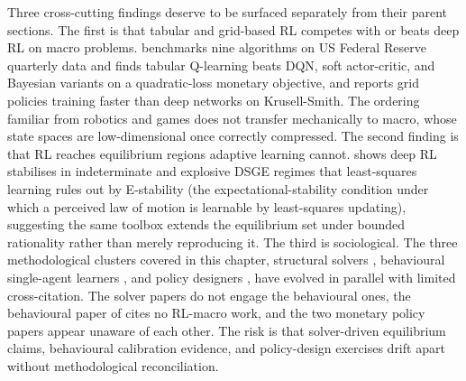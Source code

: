 Three cross-cutting findings deserve to be surfaced separately from
their parent sections. The first is that tabular and grid-based RL
competes with or beats deep RL on macro problems.
\citet{Wang2025mpu} benchmarks nine algorithms on US Federal
Reserve quarterly data and finds tabular Q-learning beats DQN, soft
actor-critic, and Bayesian variants on a quadratic-loss monetary
objective, and \citet{Yang2025srl} reports grid policies training
faster than deep networks on Krusell-Smith. The ordering familiar
from robotics and games does not transfer mechanically to macro,
whose state spaces are low-dimensional once correctly compressed.
The second finding is that RL reaches equilibrium regions adaptive
learning cannot. \citet{Chen2021drl} shows deep RL stabilises in
indeterminate and explosive DSGE regimes that least-squares
learning rules out by E-stability (the expectational-stability
condition under which a perceived law of motion is learnable by
least-squares updating), suggesting the same toolbox
extends the equilibrium set under bounded rationality rather than
merely reproducing it. The third is sociological. The three
methodological clusters covered in this chapter, structural solvers
\citep{Yang2025srl,Wibault2026rspg,Han2022deepham,Azinovic2026sequence},
behavioural single-agent learners
\citep{Kaplowitz2025,Kuriksha2021,Shi2022consumption}, and policy
designers
\citep{Zheng2022aie,Mi2024taxai,Chen2021drl,HinterlangTaenzer2024,Khundadze2025,Wang2025mpu},
have evolved in parallel with limited cross-citation. The solver
papers do not engage the behavioural ones, the behavioural paper of
\citet{Kaplowitz2025} cites no RL-macro work, and the two monetary
policy papers \citep{HinterlangTaenzer2024,Wang2025mpu} appear
unaware of each other. The risk is that solver-driven equilibrium
claims, behavioural calibration evidence, and policy-design
exercises drift apart without methodological reconciliation.
